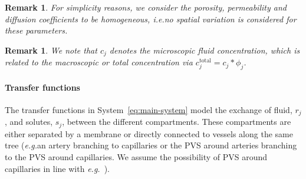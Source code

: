 \documentclass[a4paper,11pt]{article}
\newcommand{\ie}{\emph{i.e.}\;}
\newcommand{\eg}{\emph{e.g.}\;}
\newcommand{\1}{^{(1)}}
\newcommand{\2}{^{(2)}}
\newtheorem{remark}[theorem]{Remark}
\begin{document}
\begin{remark}
    For simplicity reasons, we consider the porosity, permeability and diffusion coefficients to be homogeneous, \ie no spatial variation is considered for these parameters. 
\end{remark}

\begin{remark}
    We note that $c_j$ denotes the microscopic fluid concentration, which is related to the macroscopic or total concentration via $c_j^\text{total} = c_j*\phi_j$.
\end{remark}

\paragraph{Transfer functions}
The transfer functions in System~\eqref{eq:main-system} model the exchange of fluid, $r_j$, and solutes, $s_j$, between the different compartments. 
These compartments are either separated by a membrane or directly connected to vessels along the same tree (\eg an artery branching to capillaries or the PVS around arteries branching to the PVS around capillaries. We assume the possibility of PVS around capillaries in line with \eg ~\cite{hannocks-2018-Molecular}).
\end{document}
